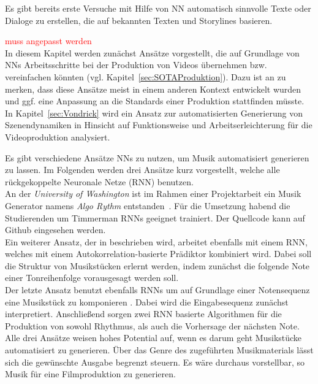 \documentclass[times, 12pt,twocolumn]{article}
\begin{document}
 \label{sec:SOTAVorverarbeitung}
Es gibt bereits erste Versuche mit Hilfe von NN automatisch sinnvolle Texte oder Dialoge zu erstellen, die auf bekannten Texten und Storylines basieren.

 \label{sec:Produktion}
\textcolor{red}{muss angepasst werden} \\
In diesem Kapitel werden zunächst Ansätze vorgestellt, die auf Grundlage von NNs Arbeitsschritte bei der Produktion von Videos übernehmen bzw. vereinfachen könnten (vgl. Kapitel~\ref{sec:SOTAProduktion}). Dazu ist an zu merken, dass diese Ansätze meist in einem anderen Kontext entwickelt wurden und ggf. eine Anpassung an die Standards einer Produktion stattfinden müsste. \\

In Kapitel~\ref{sec:Vondrick} wird ein Ansatz zur automatisierten Generierung von Szenendynamiken in Hinsicht auf Funktionsweise und Arbeitserleichterung für die Videoproduktion analysiert. 


 \label{sec:SOTAProduktion}
Es gibt verschiedene Ansätze NNs zu nutzen, um Musik automatisiert generieren zu lassen. Im Folgenden werden drei Ansätze kurz vorgestellt, welche alle rückgekoppelte Neuronale Netze (RNN) benutzen. \\
An der \textit{University of Washington} ist im Rahmen einer Projektarbeit ein Musik Generator namens \textit{Algo Rythm} entstanden~\cite{Algorithm}. Für die Umsetzung habend die Studierenden um Timmerman RNNs geeignet trainiert. Der Quellcode kann auf Github \cite{AlgorithmGit} eingesehen werden.\\
Ein weiterer Ansatz, der in \cite{eck+lapalme:2008} beschrieben wird, arbeitet ebenfalls mit einem RNN, welches mit einem Autokorrelation-basierte Prädiktor kombiniert wird. Dabei soll die Struktur von Musikstücken erlernt werden, indem zunächst die folgende Note einer Tonreihenfolge vorausgesagt werden soll. \\
Der letzte Ansatz benutzt ebenfalls RNNs um auf Grundlage einer Notensequenz eine Musikstück zu komponieren \cite{browne2001system}. Dabei wird die Eingabesequenz zunächst interpretiert. Anschließend sorgen zwei RNN basierte Algorithmen für die Produktion von sowohl Rhythmus, als auch die Vorhersage der nächsten Note. \\

Alle drei Ansätze weisen hohes Potential auf, wenn es darum geht Musikstücke automatisiert zu generieren. Über das Genre des zugeführten Musikmaterials lässt sich die gewünschte Ausgabe begrenzt steuern. Es wäre durchaus vorstellbar, so Musik für eine Filmproduktion zu generieren.
\end{document}
